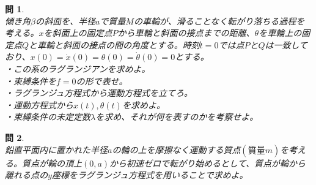 \documentclass{jsarticle}
\newtheorem{pro}{問}[section]
\begin{document}
\begin{pro}~\\
傾き角\(\beta\)の斜面を、半径\(a\)で質量\(M\)の車輪が、滑ることなく転がり落ちる過程を考える。\(x\)を斜面上の固定点\(P\)から車輪と斜面の接点までの距離、\(\theta\)を車輪上の固定点\(Q\)と車輪と斜面の接点の間の角度とする。時刻\(t=0\)では点\(P\)と\(Q\)は一致しており、\(x(0)=\dot{x}(0)=\theta(0)=\dot{\theta}(0)=0\)とする。\\
・この系のラグランジアンを求めよ。\\
・束縛条件を\(f=0\)の形で表せ。\\
・ラグランジュ方程式から運動方程式を立てろ。\\
・運動方程式から\(x(t),\theta(t)\)を求めよ。\\
・束縛条件の未定定数\(\lambda\)を求め、それが何を表すのかを考察せよ。
\end{pro}

\begin{pro}~\\
鉛直平面内に置かれた半径\(a\)の輪の上を摩擦なく運動する質点\((質量m)\)を考える。質点が輪の頂上\((0,a)\)から初速ゼロで転がり始めるとして、質点が輪から離れる点の\(y\)座標をラグランジュ方程式を用いることで求めよ。
\end{pro}
\end{document}
